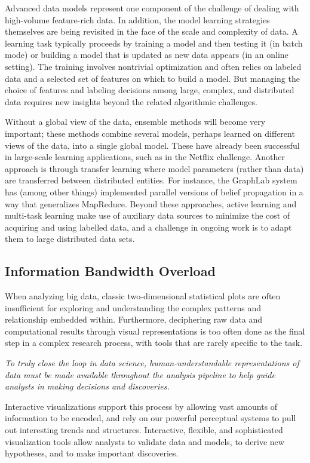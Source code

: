 \documentclass{article}
\begin{document}
Advanced data models represent one component of the challenge of dealing with high-volume feature-rich data.  In addition, the model learning strategies themselves are being revisited in the face of the scale and complexity of data. 
A learning task typically proceeds by training a model and then testing it (in batch mode) or building a model that is updated as new data appears (in an online setting). The training  involves nontrivial optimization and often relies on labeled data and a selected set of features on which to build a model. 
But managing the choice of features and labeling decisions among large, complex, and distributed data requires new insights beyond the related algorithmic challenges.  

Without a global view of the data, ensemble methods will become very important; these methods combine several models, perhaps learned on different views of the data, into a single global model.  These have already been successful in large-scale learning applications, such as in the Netflix challenge.  Another approach is through transfer learning where model parameters (rather than data) are transferred between distributed entities.  For instance, the GraphLab system~\cite{GraphLab}  has (among other things) implemented parallel versions of belief propagation in a way that generalizes MapReduce.  Beyond these approaches, active learning and multi-task learning make use of auxiliary data sources to minimize the cost of acquiring and using labelled data, and a challenge in ongoing work is to adapt them to large distributed data sets.  


\subsection*{Information Bandwidth Overload}

When analyzing big data, classic two-dimensional statistical plots are often insufficient for exploring and understanding the complex patterns and relationship embedded within. Furthermore, deciphering raw data and computational results through visual representations is too often done as the final step in a complex research process, with tools that are rarely specific to the task. 

\begin{center}
\emph{To truly close the loop in data science, human-understandable representations of data must be made available throughout the analysis pipeline to help guide analysts in making decisions and discoveries.}
\end{center} 
Interactive visualizations support this process by allowing vast amounts of information to be encoded, and rely on our powerful perceptual systems to pull out interesting trends and structures.  Interactive, flexible, and sophisticated visualization tools allow analysts to validate data and models, to derive new hypotheses, and to make important discoveries. 
\end{document}
